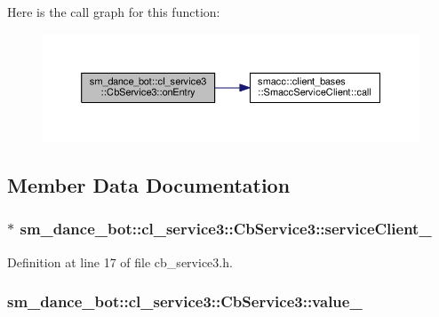Here is the call graph for this function\+:\nopagebreak
\begin{figure}[H]
\begin{center}
\leavevmode
\includegraphics[width=350pt]{classsm__dance__bot_1_1cl__service3_1_1CbService3_ae9e3796b507ad96cc0890fec0f64a4b7_cgraph}
\end{center}
\end{figure}




\subsection{Member Data Documentation}
\subsubsection[{\texorpdfstring{service\+Client\+\_\+}{serviceClient_}}]{$\ast$ sm\+\_\+dance\+\_\+bot\+::cl\+\_\+service3\+::\+Cb\+Service3\+::service\+Client\+\_\+\hspace{0.3cm}{\ttfamily [private]}}\hypertarget{classsm__dance__bot_1_1cl__service3_1_1CbService3_aad53b5aa5eb595c5add3701cfe72079c}{}\label{classsm__dance__bot_1_1cl__service3_1_1CbService3_aad53b5aa5eb595c5add3701cfe72079c}


Definition at line 17 of file cb\+\_\+service3.\+h.

\subsubsection[{\texorpdfstring{value\+\_\+}{value_}}]{ sm\+\_\+dance\+\_\+bot\+::cl\+\_\+service3\+::\+Cb\+Service3\+::value\+\_\+\hspace{0.3cm}{\ttfamily [private]}}\hypertarget{classsm__dance__bot_1_1cl__service3_1_1CbService3_a9df8640d9bc42607256ca76df60a5af0}{}\label{classsm__dance__bot_1_1cl__service3_1_1CbService3_a9df8640d9bc42607256ca76df60a5af0}


